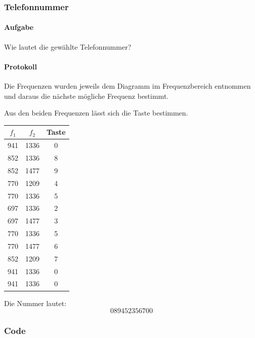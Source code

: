 \documentclass[10pt]{report}
\begin{document}
        \subsubsection{Telefonnummer}
        \paragraph{Aufgabe}
        Wie lautet die gewählte Telefonnummer?

        \paragraph{Protokoll}
        Die Frequenzen wurden jeweils dem Diagramm im Frequenzbereich entnommen
        und daraus die nächste mögliche Frequenz bestimmt.

        Aus den beiden Frequenzen lässt sich die Taste bestimmen.
        \begin{center}
            \begin{tabular}{ccc}
                \toprule
                $f_1$ & $f_2$ & Taste \\
                \midrule
                941 & 1336 & 0\\
                852 & 1336 & 8\\
                852 & 1477 & 9\\
                770 & 1209 & 4\\
                770 & 1336 & 5\\
                697 & 1336 & 2\\
                697 & 1477 & 3\\
                770 & 1336 & 5\\
                770 & 1477 & 6\\
                852 & 1209 & 7\\
                941 & 1336 & 0\\
                941 & 1336 & 0\\
                \bottomrule
            \end{tabular}
        \end{center}
        Die Nummer lautet:
        \begin{equation*}
            089452356700
        \end{equation*}



        \subsubsection{Code}
\end{document}
